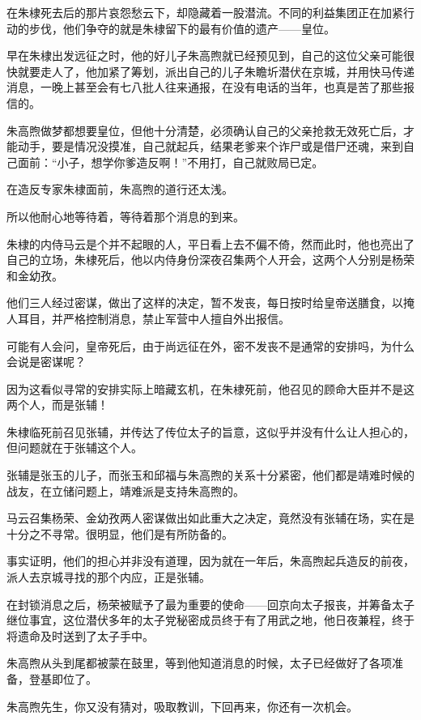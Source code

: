 \begin{multicols}{\theparacolNo}
在朱棣死去后的那片哀怨愁云下，却隐藏着一股潜流。不同的利益集团正在加紧行动的步伐，他们争夺的就是朱棣留下的最有价值的遗产——皇位。

早在朱棣出发远征之时，他的好儿子朱高煦就已经预见到，自己的这位父亲可能很快就要走人了，他加紧了筹划，派出自己的儿子朱瞻圻潜伏在京城，并用快马传递消息，一晚上甚至会有七八批人往来通报，在没有电话的当年，也真是苦了那些报信的。

朱高煦做梦都想要皇位，但他十分清楚，必须确认自己的父亲抢救无效死亡后，才能动手，要是情况没摸准，自己就起兵，结果老爹来个诈尸或是借尸还魂，来到自己面前：“小子，想学你爹造反啊！”不用打，自己就败局已定。

在造反专家朱棣面前，朱高煦的道行还太浅。

所以他耐心地等待着，等待着那个消息的到来。

朱棣的内侍马云是个并不起眼的人，平日看上去不偏不倚，然而此时，他也亮出了自己的立场，朱棣死后，他以内侍身份深夜召集两个人开会，这两个人分别是杨荣和金幼孜。

他们三人经过密谋，做出了这样的决定，暂不发丧，每日按时给皇帝送膳食，以掩人耳目，并严格控制消息，禁止军营中人擅自外出报信。

可能有人会问，皇帝死后，由于尚远征在外，密不发丧不是通常的安排吗，为什么会说是密谋呢？

因为这看似寻常的安排实际上暗藏玄机，在朱棣死前，他召见的顾命大臣并不是这两个人，而是张辅！

朱棣临死前召见张辅，并传达了传位太子的旨意，这似乎并没有什么让人担心的，但问题就在于张辅这个人。

张辅是张玉的儿子，而张玉和邱福与朱高煦的关系十分紧密，他们都是靖难时候的战友，在立储问题上，靖难派是支持朱高煦的。

马云召集杨荣、金幼孜两人密谋做出如此重大之决定，竟然没有张辅在场，实在是十分之不寻常。很明显，他们是有所防备的。

事实证明，他们的担心并非没有道理，因为就在一年后，朱高煦起兵造反的前夜，派人去京城寻找的那个内应，正是张辅。

在封锁消息之后，杨荣被赋予了最为重要的使命——回京向太子报丧，并筹备太子继位事宜，这位潜伏多年的太子党秘密成员终于有了用武之地，他日夜兼程，终于将遗命及时送到了太子手中。

朱高煦从头到尾都被蒙在鼓里，等到他知道消息的时候，太子已经做好了各项准备，登基即位了。

朱高煦先生，你又没有猜对，吸取教训，下回再来，你还有一次机会。

\ifnum{}
	\end{multicols}
\fi
\newpage

